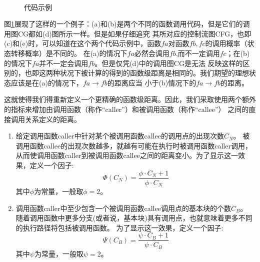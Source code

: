 \documentclass[bachelor]{njupthesis}
\begin{document}
\begin{figure}[htb]
	\centering
	 \\
	\caption{代码示例}
 	\label{pic:code}
\end{figure}

图\ref{pic:code}展现了这样的一个例子：(a)和(b)是两个不同的函数调用代码，但是它们的调用图CG都如(d)图所示一样。但是如果仔细追究
其所对应的控制流图CFG，也即(c)和(e)时，可以知道在这个两个代码示例中，函数$fa$对函数$fb,fc$的调用概率（状态转移概率）是不同的。
在(a)的情况下$fa$必然会调用$fb$,而不一定调用$fc$；在(b)的情况下$fa$并不一定会调用$fb$。但是仅凭(d)中的调用图CG是无法
反映这样的区别的，也即这两种状况下被计算的得到的函数级距离是相同的。我们期望的理想状态应该是在(a)的情况下，$fa \to fb$的距离应当
小于(b)情况下的$fa \to fb$的距离。

这就使得我们得重新定义一个更精确的函数级距离。因此，我们采取使用两个额外的指标来增加由调用函数（称作“caller”）和被调用函数（称作“callee”）
之间的直接调用关系定义的距离。
\begin{enumerate}[label=(\arabic*)]
	\item 给定调用函数caller中针对某个被调用函数callee的调用点的出现次数$C_N$。
	被调用函数callee的出现次数越多，就越有可能在执行时被调用函数caller调用，
	从而使调用函数caller到被调用函数callee之间的距离变小。为了显示这一效果，定义一个因子:
	\begin{equation}\label{eq:factor1}
	\Phi (C_N)=\frac{\phi \cdot C_N+1}{\phi \cdot C_N}
	\end{equation}
	其中$\phi$为常量，一般取$\phi=2$。
	\item 调用函数caller中至少包含一个被调用函数callee调用点的基本块的个数$C_B$。
	随着调用函数中更多分支(或者说，基本块)具有调用点，也就意味着更多不同的执行路径将包括被调用函数。
	为了显示这一效果，定义一个因子:
	\begin{equation}\label{eq:factor2}
	\Psi (C_B)=\frac{\psi \cdot C_B+1}{\psi \cdot C_B}
	\end{equation}
	其中$\psi$为常量，一般取$\psi=2$。	
\end{enumerate}
\end{document}
